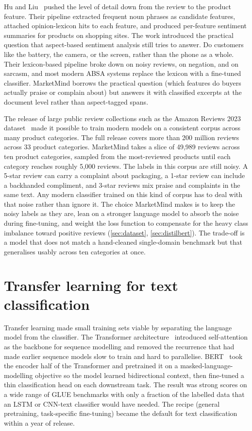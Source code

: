 \documentclass[12pt,a4paper]{report}
\begin{document}
Hu and Liu~\cite{hu2004mining} pushed the level of detail down from the review to the product feature. Their pipeline extracted frequent noun phrases as candidate features, attached opinion-lexicon hits to each feature, and produced per-feature sentiment summaries for products on shopping sites. The work introduced the practical question that aspect-based sentiment analysis still tries to answer. Do customers like the battery, the camera, or the screen, rather than the phone as a whole. Their lexicon-based pipeline broke down on noisy reviews, on negation, and on sarcasm, and most modern ABSA systems replace the lexicon with a fine-tuned classifier. MarketMind borrows the practical question (which features do buyers actually praise or complain about) but answers it with classified excerpts at the document level rather than aspect-tagged spans.

The release of large public review collections such as the Amazon Reviews 2023 dataset~\cite{ni2019justifying} made it possible to train modern models on a consistent corpus across many product categories. The full release covers more than 200 million reviews across 33 product categories. MarketMind takes a slice of 49,989 reviews across ten product categories, sampled from the most-reviewed products until each category reaches roughly 5,000 reviews. The labels in this corpus are still noisy. A 5-star review can carry a complaint about packaging, a 1-star review can include a backhanded compliment, and 3-star reviews mix praise and complaints in the same text. Any modern classifier trained on this kind of corpus has to deal with that noise rather than ignore it. The choice MarketMind makes is to keep the noisy labels as they are, lean on a stronger language model to absorb the noise during fine-tuning, and weight the loss function to compensate for the heavy class imbalance toward positive reviews (\cref{sec:dataset}, \cref{sec:distilbert}). The trade-off is a model that does not match a hand-cleaned single-domain benchmark but that generalises usably across ten categories at once.

\section{Transfer learning for text classification}
\label{sec:transfer}

Transfer learning made small training sets viable by separating the language model from the classifier. The Transformer architecture~\cite{vaswani2017attention} introduced self-attention as the backbone for sequence modelling and removed the recurrence that had made earlier sequence models slow to train and hard to parallelise. BERT~\cite{devlin2019bert} took the encoder half of the Transformer and pretrained it on a masked-language-modelling objective so the model learned bidirectional context, then fine-tuned a thin classification head on each downstream task. The result was strong scores on a wide range of GLUE benchmarks with only a fraction of the labelled data that an LSTM or CNN-text classifier would have needed. The recipe (general pretraining, task-specific fine-tuning) became the default for text classification within a year of release.
\end{document}
